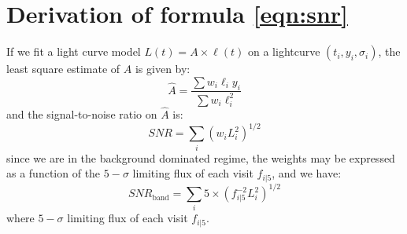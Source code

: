 \documentclass [11pt,a4paper]{article}
\begin{document}
\clearpage
\appendix
  



\section{Derivation of formula \ref{eqn:snr}}

\label{sec:snr}

If we fit a light curve model $L(t) = A \times \ell(t)$ on a
lightcurve $(t_i, y_i, \sigma_i)$, the least square estimate of $A$ is
given by:
$$
\hat{A} = \frac{\sum w_i \ell_i y_i}{\sum w_i \ell_i^2}
$$
and the signal-to-noise ratio on $\hat{A}$ is:
$$
SNR = \sum_i (w_i L_i^2)^{1/2}
$$ since we are in the background dominated regime, the weights may be
expressed as a function of the $5-\sigma$ limiting flux of each visit
$f_{i|5}$, and we have:
$$
SNR_{\mathrm{band}} = \sum_{i} 5 \times (f^{-2}_{i|5} L_i^2)^{1/2}
$$
where $5-\sigma$ limiting flux of each visit $f_{i|5}$.
\end{document}
